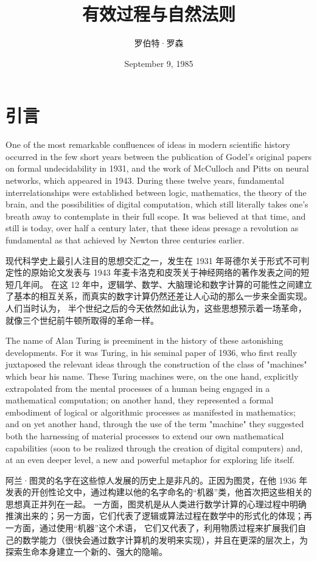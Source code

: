 \documentclass[a4paper,12pt]{article}
\title{有效过程与自然法则}
\date{September 9, 1985}	%
\author{罗伯特·罗森}
\begin{document}
\maketitle

\setcounter{tocdepth}{2}
\tableofcontents

\section{引言}

One of the most remarkable confluences of ideas in modern scientific history occurred in the few short years between the publication of Godel's
original papers on formal undecidability in 1931, and the work of McCulloch and Pitts on neural networks, which appeared in 1943.
During these twelve years, fundamental interrelationships were established between logic, mathematics, the theory of the brain,
and the possibilities of digital computation, which still literally takes one's breath away to contemplate in their full scope.
It was believed at that time, and still is today, over half a century later, that these ideas presage a revolution as fundamental
as that achieved by Newton three centuries earlier.

现代科学史上最引人注目的思想交汇之一，发生在 1931 年哥德尔关于形式不可判定性的原始论文发表与 1943 年麦卡洛克和皮茨关于神经网络的著作发表之间的短短几年间。
在这 12 年中，逻辑学、数学、大脑理论和数字计算的可能性之间建立了基本的相互关系，而真实的数字计算仍然还差让人心动的那么一步来全面实现。人们当时认为，
半个世纪之后的今天依然如此认为，这些思想预示着一场革命，就像三个世纪前牛顿所取得的革命一样。

The name of Alan Turing is preeminent in the history of these astonishing developments. For it was Turing, in his seminal paper of 1936,
who first really juxtaposed the relevant ideas through the construction of the class of "machines" which bear his name.
These Turing machines were, on the one hand, explicitly extrapolated from the mental processes of a human being engaged in a mathematical computation;
on another hand, they represented a formal embodiment of logical or algorithmic processes as manifested in mathematics;
and on yet another hand, through the use of the term "machine" they suggested both the harnessing of material processes to extend
our own mathematical capabilities (soon to be realized through the creation of digital computers) and, at an even deeper level, a new and powerful
metaphor for exploring life itself.

阿兰·图灵的名字在这些惊人发展的历史上是非凡的。正因为图灵，在他 1936 年发表的开创性论文中，通过构建以他的名字命名的“机器”类，他首次把这些相关的思想真正并列在一起。
一方面，图灵机是从人类进行数学计算的心理过程中明确推演出来的；另一方面，它们代表了逻辑或算法过程在数学中的形式化的体现；再一方面，通过使用“机器”这个术语，
它们又代表了，利用物质过程来扩展我们自己的数学能力（很快会通过数字计算机的发明来实现），并且在更深的层次上，为探索生命本身建立一个新的、强大的隐喻。
\end{document}

